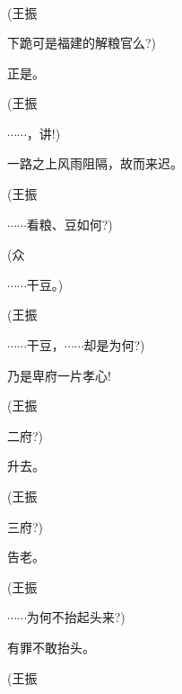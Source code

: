 \newpage\hspace{30pt}~

{%

\subsubsection{\large{}}

{\vspace{5pt}}

{(王振\hspace{40pt}~

下跪可是福建的解粮官么?)}

{正是。}\hspace{40pt}~

{(王振\hspace{40pt}~

$\cdots{}\cdots{}$，讲!)}

{一路之上风雨阻隔，故而来迟。}

{(王振\hspace{40pt}~

$\cdots{}\cdots{}$看粮、豆如何?)}

{(众\hspace{40pt}~

$\cdots{}\cdots{}$干豆。)}

{(王振\hspace{40pt}~

$\cdots{}\cdots{}$干豆，$\cdots{}\cdots{}$却是为何?)}

{乃是卑府一片孝心!}

{(王振\hspace{40pt}~

二府?)}

{升去。}\hspace{40pt}~

{(王振\hspace{40pt}~

三府?)}

{告老。}\hspace{40pt}~

{(王振\hspace{40pt}~

$\cdots{}\cdots{}$为何不抬起头来?)}

{有罪不敢抬头。}\hspace{20pt}~

{(王振\hspace{40pt}~

}}
